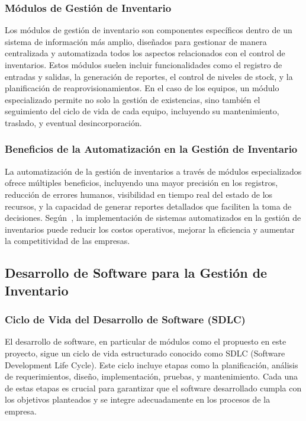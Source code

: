 \documentclass[stu, 12pt, letterpaper, donotrepeattitle, floatsintext, natbib]{apa7}
\begin{document}
\subsubsection{Módulos de Gestión de Inventario}
Los módulos de gestión de inventario son componentes específicos dentro de un sistema de información más amplio, diseñados para gestionar de
manera centralizada y automatizada todos los aspectos relacionados con el control de inventarios. Estos módulos suelen incluir funcionalidades
como el registro de entradas y salidas, la generación de reportes, el control de niveles de stock, y la planificación de reaprovisionamientos.
En el caso de los equipos, un módulo especializado permite no solo la gestión de existencias, sino también el seguimiento del ciclo de vida de
cada equipo, incluyendo su mantenimiento, traslado, y eventual desincorporación.
\subsubsection{Beneficios de la Automatización en la Gestión de Inventario}
La automatización de la gestión de inventarios a través de módulos especializados ofrece múltiples beneficios, incluyendo una mayor precisión
en los registros, reducción de errores humanos, visibilidad en tiempo real del estado de los recursos, y la capacidad de generar reportes
detallados que faciliten la toma de decisiones. Según~\cite{ll}, la implementación de sistemas automatizados en la gestión de inventarios puede
reducir los costos operativos, mejorar la eficiencia y aumentar la competitividad de las empresas.
\subsection{Desarrollo de Software para la Gestión de Inventario}
\subsubsection{Ciclo de Vida del Desarrollo de Software (SDLC)}
El desarrollo de software, en particular de módulos como el propuesto en este proyecto, sigue un ciclo de vida estructurado conocido como SDLC
(Software Development Life Cycle). Este ciclo incluye etapas como la planificación, análisis de requerimientos, diseño, implementación, pruebas,
y mantenimiento. Cada una de estas etapas es crucial para garantizar que el software desarrollado cumpla con los objetivos planteados y se
integre adecuadamente en los procesos de la empresa.
\end{document}
